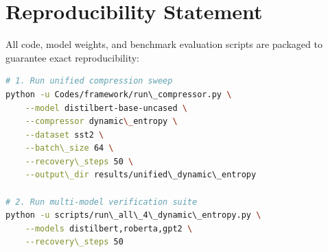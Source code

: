 \section{Reproducibility Statement}
All code, model weights, and benchmark evaluation scripts are packaged to guarantee exact reproducibility:
\begin{lstlisting}[language=bash]
# 1. Run unified compression sweep
python -u Codes/framework/run\_compressor.py \
    --model distilbert-base-uncased \
    --compressor dynamic\_entropy \
    --dataset sst2 \
    --batch\_size 64 \
    --recovery\_steps 50 \
    --output\_dir results/unified\_dynamic\_entropy

# 2. Run multi-model verification suite
python -u scripts/run\_all\_4\_dynamic\_entropy.py \
    --models distilbert,roberta,gpt2 \
    --recovery\_steps 50
\end{lstlisting}

